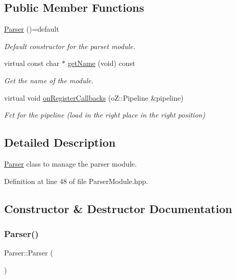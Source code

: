 \subsection*{Public Member Functions}
\begin{DoxyCompactItemize}
\item 
\hyperlink{class_parser_a5208129b497bfdf7c8ecceeb70e4bba8}{Parser} ()=default
\begin{DoxyCompactList}\small\item\em Default constructor for the parset module. \end{DoxyCompactList}\item 
virtual const char $\ast$ \hyperlink{class_parser_a655ca8534272a48ee94113695f6494fc}{get\+Name} (void) const
\begin{DoxyCompactList}\small\item\em Get the name of the module. \end{DoxyCompactList}\item 
virtual void \hyperlink{class_parser_a0e8278ef45fabe33144c78c51fbfcf7d}{on\+Register\+Callbacks} (o\+Z\+::\+Pipeline \&pipeline)
\begin{DoxyCompactList}\small\item\em Fct for the pipeline (load in the right place in the right position) \end{DoxyCompactList}\end{DoxyCompactItemize}


\subsection{Detailed Description}
\hyperlink{class_parser}{Parser} class to manage the parser module. 

Definition at line 48 of file Parser\+Module.\+hpp.



\subsection{Constructor \& Destructor Documentation}
\mbox{\label{class_parser_a5208129b497bfdf7c8ecceeb70e4bba8}} 
\subsubsection{\texorpdfstring{Parser()}{Parser()}}
{\footnotesize\ttfamily Parser\+::\+Parser (\begin{DoxyParamCaption}{ }\end{DoxyParamCaption})\hspace{0.3cm}{\ttfamily [default]}}



